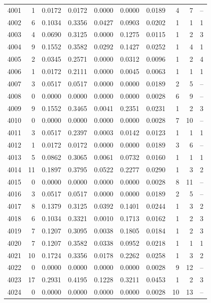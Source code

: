 \begin{longtable}{rrrrrrrrrr}
4001 & 1 & 0.0172 & 0.0172 & 0.0000 & 0.0000 & 0.0189 & 4 & 7 & -- \\
4002 & 6 & 0.1034 & 0.3356 & 0.0427 & 0.0903 & 0.0202 & 1 & 1 & 1 \\
4003 & 4 & 0.0690 & 0.3125 & 0.0000 & 0.1275 & 0.0115 & 1 & 2 & 3 \\
4004 & 9 & 0.1552 & 0.3582 & 0.0292 & 0.1427 & 0.0252 & 1 & 4 & 1 \\
4005 & 2 & 0.0345 & 0.2571 & 0.0000 & 0.0312 & 0.0096 & 1 & 2 & 4 \\
4006 & 1 & 0.0172 & 0.2111 & 0.0000 & 0.0045 & 0.0063 & 1 & 1 & 1 \\
4007 & 3 & 0.0517 & 0.0517 & 0.0000 & 0.0000 & 0.0189 & 2 & 5 & -- \\
4008 & 0 & 0.0000 & 0.0000 & 0.0000 & 0.0000 & 0.0028 & 6 & 9 & -- \\
4009 & 9 & 0.1552 & 0.3465 & 0.0041 & 0.2351 & 0.0231 & 1 & 2 & 3 \\
4010 & 0 & 0.0000 & 0.0000 & 0.0000 & 0.0000 & 0.0028 & 7 & 10 & -- \\
4011 & 3 & 0.0517 & 0.2397 & 0.0003 & 0.0142 & 0.0123 & 1 & 1 & 1 \\
4012 & 1 & 0.0172 & 0.0172 & 0.0000 & 0.0000 & 0.0189 & 3 & 6 & -- \\
4013 & 5 & 0.0862 & 0.3065 & 0.0061 & 0.0732 & 0.0160 & 1 & 1 & 1 \\
4014 & 11 & 0.1897 & 0.3795 & 0.0522 & 0.2277 & 0.0290 & 1 & 3 & 2 \\
4015 & 0 & 0.0000 & 0.0000 & 0.0000 & 0.0000 & 0.0028 & 8 & 11 & -- \\
4016 & 3 & 0.0517 & 0.0517 & 0.0000 & 0.0000 & 0.0189 & 2 & 5 & -- \\
4017 & 8 & 0.1379 & 0.3125 & 0.0392 & 0.1401 & 0.0244 & 1 & 3 & 2 \\
4018 & 6 & 0.1034 & 0.3321 & 0.0010 & 0.1713 & 0.0162 & 1 & 2 & 3 \\
4019 & 7 & 0.1207 & 0.3095 & 0.0038 & 0.1805 & 0.0184 & 1 & 2 & 3 \\
4020 & 7 & 0.1207 & 0.3582 & 0.0338 & 0.0952 & 0.0218 & 1 & 1 & 1 \\
4021 & 10 & 0.1724 & 0.3356 & 0.0178 & 0.2262 & 0.0258 & 1 & 3 & 2 \\
4022 & 0 & 0.0000 & 0.0000 & 0.0000 & 0.0000 & 0.0028 & 9 & 12 & -- \\
4023 & 17 & 0.2931 & 0.4195 & 0.1228 & 0.3211 & 0.0453 & 1 & 2 & 3 \\
4024 & 0 & 0.0000 & 0.0000 & 0.0000 & 0.0000 & 0.0028 & 10 & 13 & -- \\

\end{longtable}
